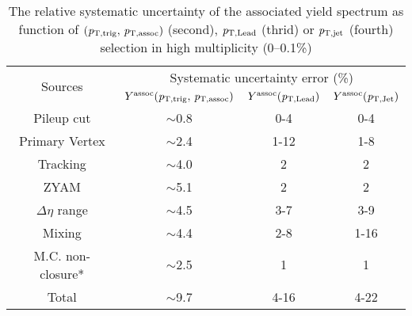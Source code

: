 \begin{table}[!h]
\caption{ The relative systematic uncertainty of the associated yield spectrum as function of 
$(\it{p}_{\rm{T, trig}},\,\it{p}_{\rm{T, assoc}})$ (second), $\it{p}_{\rm{T,Lead}}$ (thrid) or $\it{p}_{\rm{T,jet}}$ (fourth) selection in high multiplicity (0--0.1\%) }
\centering
\begin{tabular}{|c|c|c|c|}
\hline 
\multirow{2}{*}{Sources}  & \multicolumn{3}{c|}{Systematic uncertainty error (\%)} \\\cline{2-4}
         & $Y^{\rm{assoc}}(\it{p}_{\rm{T, trig}},\,\it{p}_{\rm{T, assoc}})$ & $Y^{\rm{assoc}}(\it{p}_{\rm{T, Lead}})$ & $Y^{\rm{assoc}}(\it{p}_{\rm{T, Jet}})$ \\ \hline \hline
Pileup cut			& $\sim$0.8	&0-4		&0-4		\\ \hline
Primary Vertex		& $\sim$2.4	&1-12	&1-8		\\ \hline

Tracking			& $\sim$4.0 	&2		&2		\\ \hline

ZYAM			& $\sim$5.1	&2		&2		\\ \hline
$\Delta\eta$ range	& $\sim$4.5	&3-7		&3-9		\\ \hline

Mixing			& $\sim$4.4	&2-8		&1-16	\\ \hline

M.C. non-closure*	& $\sim$2.5 	&1		&1		\\ \hline
Total 			& $\sim$9.7	&4-16	&4-22	\\ 
\hline 
\end{tabular}

\end{table}

